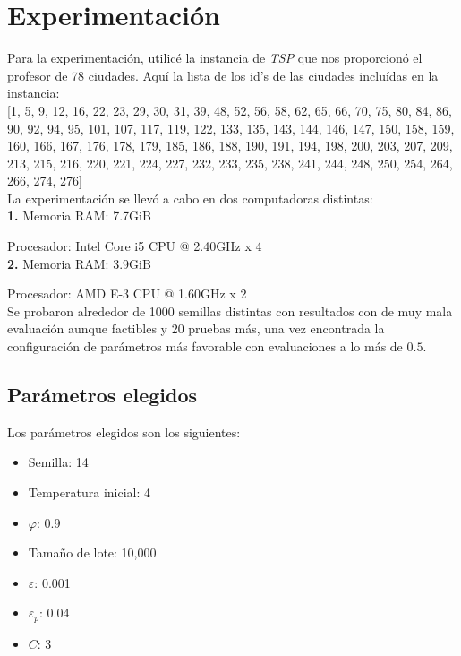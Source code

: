 \documentclass[12pt]{article}
\begin{document}
\newpage
\section{Experimentación}
Para la experimentación, utilicé la instancia de \textit{TSP} que nos
proporcionó el profesor de 78 ciudades.
Aquí la lista de los id's de las ciudades incluídas en la instancia:\\

[1, 5, 9, 12, 16, 22, 23, 29, 30, 31, 39, 48, 52, 56, 58, 62, 65, 66, 70, 75, 80, 84, 86, 90, 92, 94, 95, 101, 107, 117, 119, 122, 133, 135, 143, 144, 146, 147, 150, 158, 159, 160, 166, 167, 176, 178, 179, 185, 186, 188, 190, 191, 194, 198, 200, 203, 207, 209, 213, 215, 216, 220, 221, 224, 227, 232, 233, 235, 238, 241, 244, 248, 250, 254, 264, 266, 274, 276]
\\


La experimentación se llevó a cabo en dos computadoras distintas:\\

\textbf{1.} Memoria RAM: 7.7GiB

Procesador: Intel Core i5 CPU @ 2.40GHz x 4\\

\textbf{2.} Memoria RAM: 3.9GiB

Procesador: AMD E-3 CPU @ 1.60GHz x 2\\

Se probaron alrededor de 1000 semillas distintas con resultados con de muy mala evaluación aunque factibles y 20 pruebas más, una vez encontrada la configuración de parámetros más favorable con evaluaciones a lo más de $0.5$.
\subsection*{Parámetros elegidos}
Los parámetros elegidos son los siguientes:
\begin{itemize}
\item Semilla: 14
\item Temperatura inicial: 4
\item \textbf{$\varphi$}: 0.9
\item Tamaño de lote: 10,000
\item \textbf{$\varepsilon$}: 0.001
\item \textbf{$\varepsilon_p$}: 0.04
\item \textbf{$C$}: 3
\end{itemize}
\newpage
\end{document}
